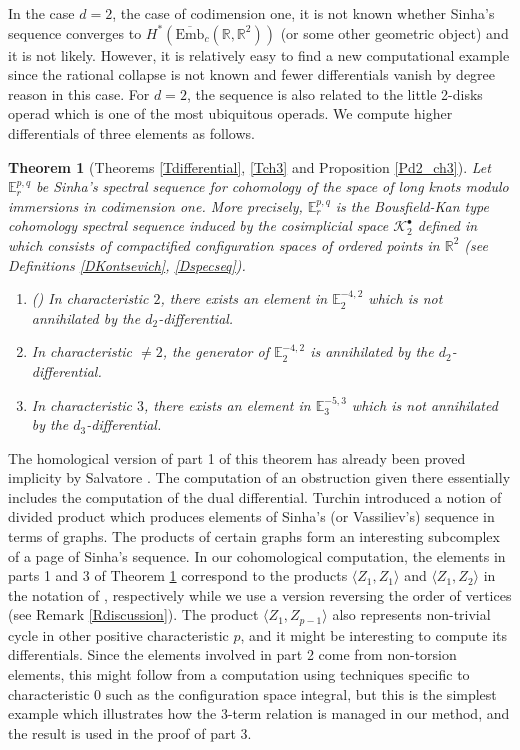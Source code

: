 \documentclass[reqno]{amsart}
\theoremstyle{definition}
\theoremstyle{plain}
\newtheorem{thm}[defi]{Theorem}
\newcommand{\KK}{\mathcal{K}}%
\newcommand{\Embbar}{\overline{\mathrm{Emb}}}
\newcommand{\RR}{\mathbb{R}}
\newcommand{\EE}{\mathbb{E}}
\begin{document}
In the case $d=2$, the case of { codimension one}, it is not known whether Sinha's  sequence converges to $H^*(\Embbar_c(\RR,\RR^2))$ (or some other geometric object) and it is not likely.  However,  it is relatively easy to find a new computational example since the rational collapse is not known and fewer differentials vanish by degree reason in this case.  For $d=2$, the sequence is also related to  the little 2-disks operad which is one of the most ubiquitous operads. We compute   higher differentials of three elements as follows.
\begin{thm}[Theorems \ref{Tdifferential}, \ref{Tch3} and Proposition \ref{Pd2_ch3}]\label{Tmain}
Let $\EE_r^{p,q}$ be Sinha's spectral sequence for  cohomology of the space of long knots modulo immersions in codimension one. More precisely, $\EE^{p,q}_r$ is the Bousfield-Kan type cohomology spectral sequence induced by the cosimplicial space $\KK^\bullet_2$ defined in \cite{sinha1} which consists of compactified configuration spaces of ordered points in $\RR^2$  (see Definitions \ref{DKontsevich}, \ref{Dspecseq}).

\begin{enumerate}
\item (\cite{salvatore}) In characteristic $2$, there exists an element in $\EE_2^{-4,2}$ which is not annihilated by the $d_2$-differential.
\item In characteristic  $\not=2$, the generator of $\EE_2^{-4,2}$ is annihilated by the $d_2$-differential. 
\item In characteristic $3$, there exists an element in $\EE_3^{-5,3}$ which is not annihilated by the $d_3$-differential. 
\end{enumerate}
\end{thm}
The homological version of  part 1 of this theorem has already been proved implicity by Salvatore \cite{salvatore}. The computation of an obstruction given there essentially includes the computation of the dual differential. Turchin \cite{turchin} introduced a notion of divided product which produces elements of Sinha's (or Vassiliev's) sequence in terms of graphs. The  products  of certain graphs  form an interesting subcomplex of a page  of Sinha's sequence. In our cohomological computation, the elements in  parts 1 and 3 of Theorem \ref{Tmain} correspond to the products $\langle Z_1,Z_1\rangle$ and $\langle Z_1, Z_2\rangle$ in the notation of \cite{turchin}, respectively while we use a version reversing the order of vertices (see Remark \ref{Rdiscussion}). The product $\langle Z_1, Z_{p-1}\rangle$ also represents non-trivial cycle in other positive characteristic $p$, and it might be interesting to compute its differentials. Since the  elements involved in  part 2  come from non-torsion elements,  this  might follow from a computation using techniques specific to characteristic 0 such as the configuration space integral, but this is the simplest example which  illustrates how  the 3-term relation is managed in our method, and the result is used in the proof of  part 3.\\
\end{document}
